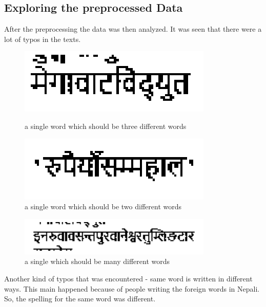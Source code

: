 \documentclass[12pt]{report}
\begin{document}
            \subsection{Exploring the preprocessed Data}
            After the preprocessing the data was then analyzed. It was seen that there were a lot of typos in the texts. 
            \begin{figure}[!htb]
                \begin{minipage}{0.48\textwidth}
                  \centering
                  \includegraphics[width=.7\linewidth]{typo11.png}
                  \caption{a single word which should be three different words}\label{Fig:typo1}
                \end{minipage}\hfill
                \begin{minipage}{0.48\textwidth}
                  \centering
                  \includegraphics[width=.7\linewidth]{typo22.png}
                  \caption{a single word which should be two different words}\label{Fig:typo2}
                \end{minipage}
             \end{figure}

             \begin{figure}[h]
                 \centering
                 \includegraphics[width=.7\linewidth]{typo33.png}
                 \caption{a single which should be many different words}\label{Fig:typo3}
             \end{figure}

            Another kind of typos that was encountered - same word is written in different ways. This main happened 
            because of people writing the foreign words in Nepali. So, the spelling for the same word was different.
            
\end{document}
